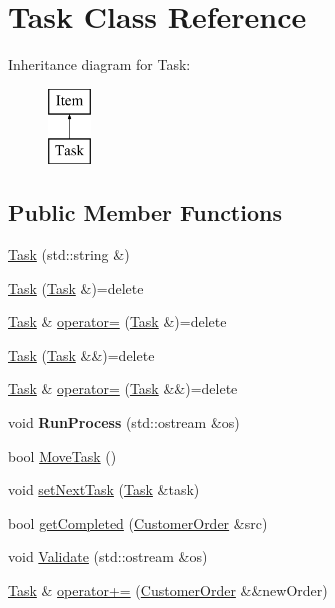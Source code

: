 \hypertarget{class_task}{}\section{Task Class Reference}
\label{class_task}
Inheritance diagram for Task\+:\begin{figure}[H]
\begin{center}
\leavevmode
\includegraphics[height=2.000000cm]{class_task}
\end{center}
\end{figure}
\subsection*{Public Member Functions}
\begin{DoxyCompactItemize}
\item 
\mbox{\hyperlink{class_task_a43834b15cba574ccd4f25af665649776}{Task}} (std\+::string \&)
\item 
\mbox{\hyperlink{class_task_a60073fae7e07b8d1721b1bc73adcc6c8}{Task}} (\mbox{\hyperlink{class_task}{Task}} \&)=delete
\item 
\mbox{\hyperlink{class_task}{Task}} \& \mbox{\hyperlink{class_task_a95c7171fb2f939f1e4ae9a82f1c7c32d}{operator=}} (\mbox{\hyperlink{class_task}{Task}} \&)=delete
\item 
\mbox{\hyperlink{class_task_ae146c98551f244f62b93bc7b4e334580}{Task}} (\mbox{\hyperlink{class_task}{Task}} \&\&)=delete
\item 
\mbox{\hyperlink{class_task}{Task}} \& \mbox{\hyperlink{class_task_ada7e932e1a40e87069806c264ca3b2c5}{operator=}} (\mbox{\hyperlink{class_task}{Task}} \&\&)=delete
\item 
\mbox{\label{class_task_a77d0a5c728a3d0bec89217afbd3addfd}} 
void {\bfseries Run\+Process} (std\+::ostream \&os)
\item 
bool \mbox{\hyperlink{class_task_ad5f00535195117634b86714e628abd77}{Move\+Task}} ()
\item 
void \mbox{\hyperlink{class_task_aca65eac4162faecd7cce47db096183fc}{set\+Next\+Task}} (\mbox{\hyperlink{class_task}{Task}} \&task)
\item 
bool \mbox{\hyperlink{class_task_a6cfa898328059215d5a89f27aac7985b}{get\+Completed}} (\mbox{\hyperlink{class_customer_order}{Customer\+Order}} \&src)
\item 
void \mbox{\hyperlink{class_task_ad94a831f3fd8c66b41a1dd24f751cbb1}{Validate}} (std\+::ostream \&os)
\item 
\mbox{\hyperlink{class_task}{Task}} \& \mbox{\hyperlink{class_task_a3ed2681da2f886dc5742dc180f03a3b8}{operator+=}} (\mbox{\hyperlink{class_customer_order}{Customer\+Order}} \&\&new\+Order)
\end{DoxyCompactItemize}


